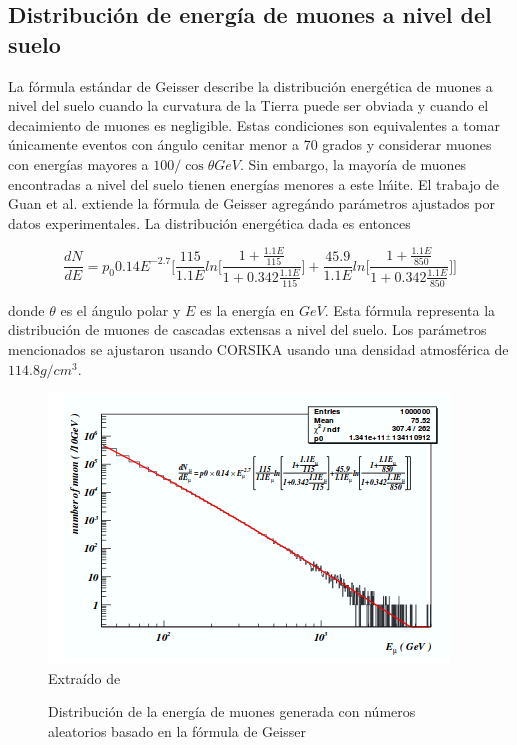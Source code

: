 \documentclass{book}
\begin{document}
\subsection{Distribuci\'on de energ\'ia de muones a nivel del suelo}
La fórmula estándar de Geisser describe la distribución energética de muones a nivel del suelo cuando la curvatura de la Tierra puede ser obviada y cuando el decaimiento de muones es negligible. Estas condiciones son equivalentes a tomar \'unicamente eventos con \'angulo cenitar menor a 70 grados y considerar muones con energ\'ias mayores a $100/\cos\theta GeV$. Sin embargo, la mayor\'ia de muones encontradas a nivel del suelo tienen energ\'ias menores a este l\'mite. El trabajo de Guan et al. extiende la f\'ormula de Geisser agreg\'ando par\'ametros ajustados por datos experimentales. La distribuci\'on energ\'etica dada es entonces

\begin{equation}
\frac{dN}{dE}=p_{0}0.14E^{-2.7}\Bigg[\frac{115}{1.1E}ln\Bigg[\frac{1+\frac{1.1E}{115}}{1+0.342\frac{1.1E}{115}}\Bigg]+\frac{45.9}{1.1E}ln\Bigg[\frac{1+\frac{1.1E}{850}}{1+0.342\frac{1.1E}{850}}\Bigg]\Bigg]
\end{equation}

donde $\theta$ es el ángulo polar y $E$ es la energía en $GeV$. Esta f\'ormula representa la distribuci\'on de muones de cascadas extensas a nivel del suelo. Los par\'ametros mencionados se ajustaron usando CORSIKA usando una densidad atmosf\'erica de $114.8 g/cm^3$. \citep{GUAN}

\begin{figure}[ht] %
\begin{center}
 \includegraphics[]{GeisserMuon.png}
 Extra\'ido de \citep{GUAN}
\caption{Distribuci\'on de la energ\'ia de muones generada con n\'umeros aleatorios basado en la f\'ormula de Geisser}
\end{center}
\end{figure}
\end{document}
